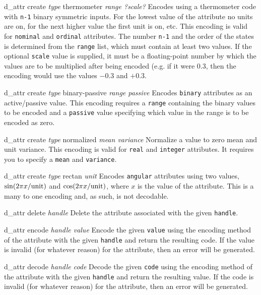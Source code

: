 \documentclass{article}
\begin{document}
\begin{options}
\begin{options}
\item[d\_attr create \textsl{type} thermometer \textsl{range ?scale?}]
    Encodes using a thermometer code with \texttt{n-1} binary
    symmetric inputs.  For the lowest value of the attribute no units
    are on, for the next higher value the first unit is on, etc.  This
    encoding is valid for \texttt{nominal} and \texttt{ordinal}
    attributes.  The number \texttt{n-1} and the order of the states
    is determined from the \texttt{range} list, which must contain at
    least two values.  If the optional \texttt{scale} value is
    supplied, it must be a floating-point number by which the values
    are to be multiplied after being encoded (e.g. if it were $0.3$,
    then the encoding would use the values $-0.3$ and $+0.3$.
\item[d\_attr create \textsl{type} binary-passive \textsl{range passive}]
    Encodes \texttt{binary} attributes as an active/passive value. This
    encoding requires a \texttt{range} containing the binary values to
    be encoded and a \texttt{passive} value specifying which value in
    the range is to be encoded as zero.
\item[d\_attr create \textsl{type} normalized \textsl{mean variance}]
    Normalize a value to zero mean and unit variance. This encoding is
    valid for \texttt{real} and \texttt{integer} attributes.  It
    requires you to specify a \texttt{mean} and \texttt{variance}.
\item[d\_attr create \textsl{type} rectan \textsl{unit}]
    Encodes \texttt{angular} attributes using two values, $\sin(2\pi
    x/{\rm unit})$ and $\cos(2\pi x/{\rm unit})$, where $x$ is the value
    of the attribute.  This is a many to one encoding and, as such, is
    not decodable.
\end{options}
\item[d\_attr delete \textsl{handle}]
Delete the attribute associated with the given \texttt{handle}.
\item[d\_attr encode \textsl{handle value}]
Encode the given \texttt{value} using the encoding method of the
attribute with the given \texttt{handle} and return the resulting code.
If the value is invalid (for whatever reason) for the attribute, then an
error will be generated.
\item[d\_attr decode \textsl{handle code}]
Decode the given \texttt{code} using the encoding method of the
attribute with the given \texttt{handle} and return the resulting value.
If the code is invalid (for whatever reason) for the attribute, then an
error will be generated.
\end{options}
\end{document}
